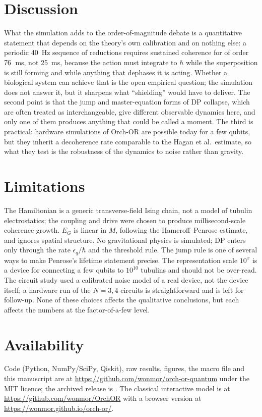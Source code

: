 \documentclass[11pt]{article}
\begin{document}
\section{Discussion}
What the simulation adds to the order-of-magnitude debate is a quantitative statement that depends on the theory's own calibration and on nothing else: a periodic 40~Hz sequence of reductions requires sustained coherence for of order $76$~ms, not 25~ms, because the action must integrate to $\hbar$ while the superposition is still forming and while anything that dephases it is acting. Whether a biological system can achieve that is the open empirical question; the simulation does not answer it, but it sharpens what ``shielding'' would have to deliver. The second point is that the jump and master-equation forms of DP collapse, which are often treated as interchangeable, give different observable dynamics here, and only one of them produces anything that could be called a moment. The third is practical: hardware simulations of Orch-OR are possible today for a few qubits, but they inherit a decoherence rate comparable to the Hagan et al.\ estimate, so what they test is the robustness of the dynamics to noise rather than gravity.

\section{Limitations}
The Hamiltonian is a generic transverse-field Ising chain, not a model of tubulin electrostatics; the coupling and drive were chosen to produce millisecond-scale coherence growth. $E_G$ is linear in $M$, following the Hameroff--Penrose estimate, and ignores spatial structure. No gravitational physics is simulated; DP enters only through the rate $\epsilon_q/\hbar$ and the threshold rule. The jump rule is one of several ways to make Penrose's lifetime statement precise. The representation scale $10^x$ is a device for connecting a few qubits to $10^{10}$ tubulins and should not be over-read. The circuit study used a calibrated noise model of a real device, not the device itself; a hardware run of the $N=3,4$ circuits is straightforward and is left for follow-up. None of these choices affects the qualitative conclusions, but each affects the numbers at the factor-of-a-few level.

\section{Availability}\label{sec:avail}
Code (Python, NumPy/SciPy, Qiskit), raw results, figures, the macro file and this manuscript are at \url{https://github.com/wonmor/orch-or-quantum} under the MIT licence; the archived release is . The classical interactive model is at \url{https://github.com/wonmor/OrchOR} with a browser version at \url{https://wonmor.github.io/orch-or/}.
\end{document}
